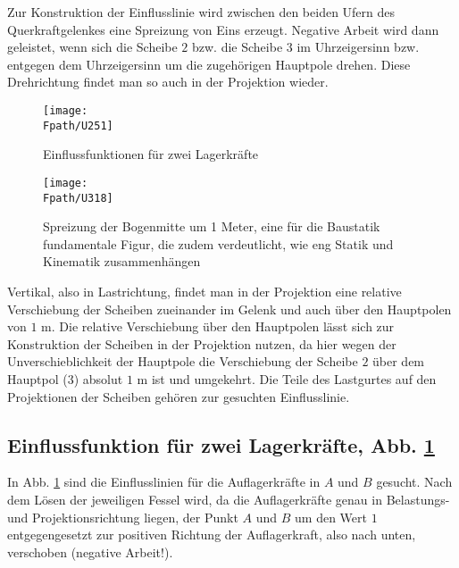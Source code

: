 Zur Konstruktion der Einflusslinie wird zwischen den beiden Ufern des Querkraftgelenkes eine Spreizung von Eins erzeugt. Negative Arbeit wird dann  geleistet, wenn sich die Scheibe $2$ bzw. die Scheibe $3$ im Uhrzeigersinn bzw. entgegen dem Uhrzeigersinn um die zugeh\"{o}rigen Hauptpole drehen. Diese Drehrichtung findet man so auch in der Projektion wieder.
\begin{figure}[tbp]
\centering
\if {} \sidecaption \fi
\texttt{[image: \\Fpath/U251]}
\caption{Einflussfunktionen f\"{u}r zwei Lagerkr\"{a}fte} \label{U251}
\end{figure}%
\begin{figure}[tbp]
\centering
\if {} \sidecaption \fi
\texttt{[image: \\Fpath/U318]}
\caption{Spreizung der Bogenmitte um 1 Meter, eine f\"{u}r die Baustatik fundamentale Figur, die zudem verdeutlicht, wie eng Statik und Kinematik zusammenh\"{a}ngen} \label{U318}
\end{figure}%

Vertikal, also in Lastrichtung, findet man in der Projektion eine relative Verschiebung der Scheiben zueinander im Gelenk und auch \"{u}ber den Hauptpolen von $1$ m. Die relative Verschiebung \"{u}ber den Hauptpolen l\"{a}sst sich zur Konstruktion der Scheiben in der Projektion nutzen, da hier wegen der Unverschieblichkeit der Hauptpole die Verschiebung der Scheibe $2$ \"{u}ber dem Hauptpol (3) absolut $1$ m ist und umgekehrt. Die Teile des Lastgurtes auf den Projektionen der Scheiben geh\"{o}ren zur gesuchten Einflusslinie.

{\textcolor{sectionTitleBlue}{\subsection{Einflussfunktion f\"{u}r zwei Lagerkr\"{a}fte, Abb. \ref{U251}}}}

In Abb. \ref{U251} sind die Einflusslinien f\"{u}r die Auflagerkr\"{a}fte in $A$ und $B$ gesucht. Nach dem L\"{o}sen der jeweiligen Fessel wird, da die Auflagerkr\"{a}fte genau in Belastungs- und Projektionsrichtung liegen, der Punkt $A$ und $B$ um den Wert $1$ entgegengesetzt zur positiven Richtung der Auflagerkraft, also nach unten, verschoben (negative Arbeit!).

